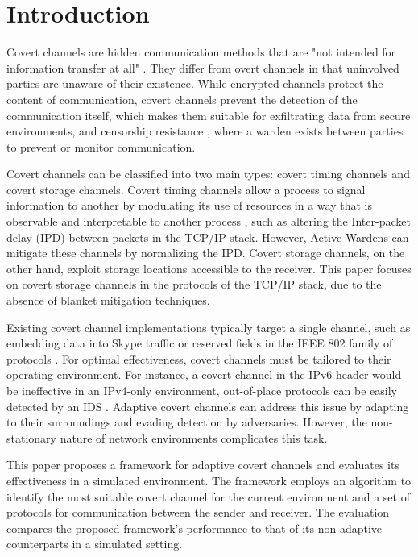 \chapter{Introduction}
\label{ch:introduction}

Covert channels are hidden communication methods that are "not intended for information transfer at all" \cite{ANOTCP}. They differ from overt channels in that uninvolved parties are unaware of their existence. While encrypted channels protect the content of communication, covert channels prevent the detection of the communication itself, which makes them suitable for exfiltrating data from secure environments, and censorship resistance \cite{TWACCS}, where a warden exists between parties to prevent or monitor communication.

Covert channels can be classified into two main types: covert timing channels and covert storage channels. Covert timing channels allow a process to signal information to another by modulating its use of resources in a way that is observable and interpretable to another process \cite{TCSEC}, such as altering the Inter-packet delay (IPD) between packets in the TCP/IP stack. However, Active Wardens \cite{DIAWAPSCC} can mitigate these channels by normalizing the IPD. Covert storage channels, on the other hand, exploit storage locations accessible to the receiver. This paper focuses on covert storage channels in the protocols of the TCP/IP stack, due to the absence of blanket mitigation techniques.

Existing covert channel implementations typically target a single channel, such as embedding data into Skype traffic \cite{DAMBCTCST} or reserved fields in the IEEE 802 family of protocols \cite{CCiLANP}. For optimal effectiveness, covert channels must be tailored to their operating environment. For instance, a covert channel in the IPv6 header would be ineffective in an IPv4-only environment, out-of-place protocols can be easily detected by an IDS \cite{TWACCS}. Adaptive covert channels can address this issue by adapting to their surroundings and evading detection by adversaries. However, the non-stationary nature of network environments \cite{PNFD} complicates this task.

This paper proposes a framework for adaptive covert channels and evaluates its effectiveness in a simulated environment. The framework employs an algorithm to identify the most suitable covert channel for the current environment and a set of protocols for communication between the sender and receiver. The evaluation compares the proposed framework's performance to that of its non-adaptive counterparts in a simulated setting.
